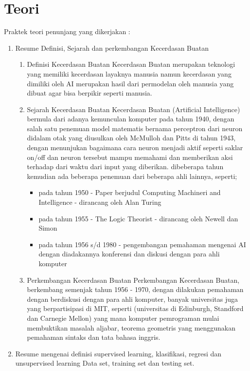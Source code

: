 \section{Teori}
Praktek teori penunjang yang dikerjakan :
\begin{enumerate}
\item Resume Definisi, Sejarah dan perkembangan Kecerdasan Buatan
	\begin{enumerate}
	\item Definisi Kecerdasan Buatan
	\newline Kecerdasan Buatan merupakan teknologi yang memiliki kecerdasan layaknya manusia namun kecerdasan yang dimiliki oleh AI merupakan hasil dari permodelan oleh manusia yang dibuat agar bisa berpikir seperti manusia.
	\item Sejarah Kecerdasan Buatan
	\newline Kecerdasan Buatan (Artificial Intelligence) bermula dari adanya kemunculan komputer pada tahun 1940, dengan salah satu penemuan model matematis bernama perceptron dari neuron didalam otak yang diusulkan oleh McMulloh dan Pitts di tahun 1943, dengan menunjukan bagaimana cara neuron menjadi aktif seperti saklar on/off dan neuron tersebut mampu memahami dan memberikan aksi terhadap dari waktu dari input yang diberikan. dibeberapa tahun kemudian ada beberapa penemuan dari beberapa ahli lainnya, seperti;
		\begin{itemize}
		 \item pada tahun 1950 - Paper berjudul Computing Machineri and Intelligence - dirancang oleh Alan Turing
		 \item pada tahun 1955 - The Logic Theorist - dirancang oleh Newell dan Simon
		 \item pada tahun 1956 s/d 1980 - pengembangan pemahaman mengenai AI dengan diadakannya konferensi dan diskusi dengan para ahli komputer
		\end{itemize}
	\item Perkembangan Kecerdasan Buatan
	\newline Perkembangan Kecerdasan Buatan, berkembang semenjak tahun 1956 - 1970, dengan dilakukan pemahaman dengan berdiskusi dengan para ahli komputer, banyak universitas juga yang berpartisipasi di MIT, seperti (universitas di Edinburgh, Standford dan Carnegie Mellon) yang mana komputer pemrograman mulai membuktikan masalah aljabar, teorema geometris yang menggunakan pemahaman sintaks dan tata bahasa inggris.
	\end{enumerate}
\item Resume mengenai definisi supervised learning, klasifikasi, regresi dan unsupervised learning Data set, training set dan testing set.

\end{enumerate}

